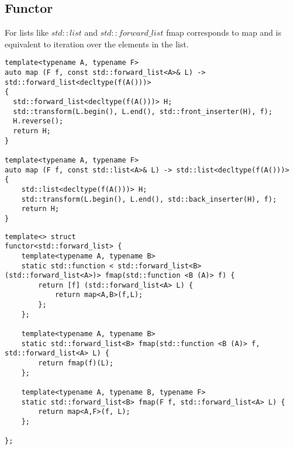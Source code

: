 \documentclass[12pt,fleqn]{article}
\begin{document}
\subsection{Functor}
%
%


For lists like $std::list$ and $std::forward\_list$ fmap corresponds to map and is equivalent to iteration over the elements in the list.

\begin{minipage}{\linewidth}
\begin{lstlisting}[caption=map function using std::transform, label=maps]
template<typename A, typename F>
auto map (F f, const std::forward_list<A>& L) -> std::forward_list<decltype(f(A()))>
{
  std::forward_list<decltype(f(A()))> H;
  std::transform(L.begin(), L.end(), std::front_inserter(H), f);
  H.reverse();
  return H;
}

template<typename A, typename F>
auto map (F f, const std::list<A>& L) -> std::list<decltype(f(A()))>
{
	std::list<decltype(f(A()))> H;
	std::transform(L.begin(), L.end(), std::back_inserter(H), f);
	return H;
}
\end{lstlisting}
\end{minipage}


\begin{minipage}{\linewidth}
\begin{lstlisting}[caption=functor for std::forward\_list, label=functorfwdlist]
template<> struct 
functor<std::forward_list> {
	template<typename A, typename B>
	static std::function < std::forward_list<B> (std::forward_list<A>)> fmap(std::function <B (A)> f) {
		return [f] (std::forward_list<A> L) {
			return map<A,B>(f,L);
		};
	};

	template<typename A, typename B>
	static std::forward_list<B> fmap(std::function <B (A)> f, std::forward_list<A> L) {
		return fmap(f)(L);
	};

	template<typename A, typename B, typename F>
	static std::forward_list<B> fmap(F f, std::forward_list<A> L) {
		return map<A,F>(f, L);
	};

};
\end{lstlisting}
\end{minipage}
\end{document}
